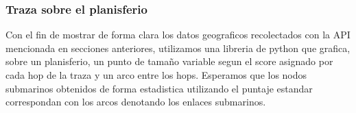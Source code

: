 \subsubsection{Traza sobre el planisferio}
Con el fin de mostrar de forma clara los datos geograficos recolectados con la API mencionada en secciones anteriores, utilizamos una libreria de python que grafica, sobre un planisferio, un punto de tamaño variable segun el score asignado por cada hop de la traza y un arco entre los hops. Esperamos que los nodos submarinos obtenidos de forma estadistica utilizando el puntaje estandar correspondan con los arcos denotando los enlaces submarinos.
